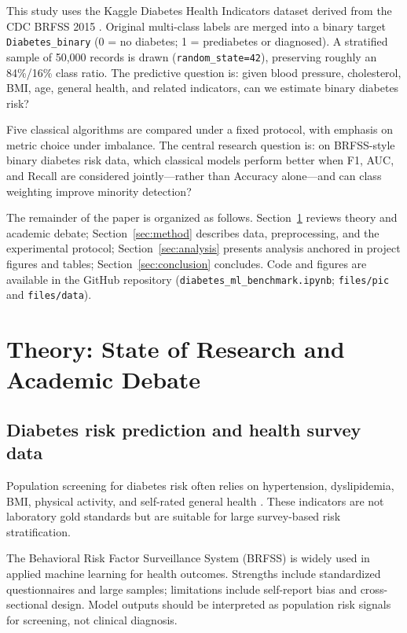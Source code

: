 \documentclass[11pt,a4paper]{article}
\begin{document}
This study uses the Kaggle Diabetes Health Indicators dataset derived from the CDC BRFSS 2015 \citep{CDC2015,TeboulND}. Original multi-class labels are merged into a binary target \texttt{Diabetes\_binary} (0 = no diabetes; 1 = prediabetes or diagnosed). A stratified sample of 50,000 records is drawn (\lstinline{random_state=42}), preserving roughly an 84\%/16\% class ratio. The predictive question is: given blood pressure, cholesterol, BMI, age, general health, and related indicators, can we estimate binary diabetes risk?

Five classical algorithms are compared under a fixed protocol, with emphasis on metric choice under imbalance. The central research question is: on BRFSS-style binary diabetes risk data, which classical models perform better when F1, AUC, and Recall are considered jointly---rather than Accuracy alone---and can class weighting improve minority detection?

The remainder of the paper is organized as follows. Section~\ref{sec:theory} reviews theory and academic debate; Section~\ref{sec:method} describes data, preprocessing, and the experimental protocol; Section~\ref{sec:analysis} presents analysis anchored in project figures and tables; Section~\ref{sec:conclusion} concludes. Code and figures are available in the GitHub repository (\lstinline{diabetes_ml_benchmark.ipynb}; \texttt{files/pic} and \texttt{files/data}).

\section{Theory: State of Research and Academic Debate}\label{sec:theory}

\subsection{Diabetes risk prediction and health survey data}\label{sec:theory-data}

Population screening for diabetes risk often relies on hypertension, dyslipidemia, BMI, physical activity, and self-rated general health \citep{ADA2021}. These indicators are not laboratory gold standards but are suitable for large survey-based risk stratification.

The Behavioral Risk Factor Surveillance System (BRFSS) is widely used in applied machine learning for health outcomes. Strengths include standardized questionnaires and large samples; limitations include self-report bias and cross-sectional design. Model outputs should be interpreted as population risk signals for screening, not clinical diagnosis.
\end{document}
